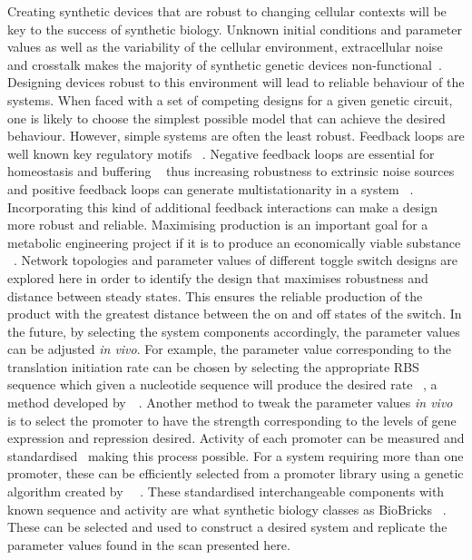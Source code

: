 Creating synthetic devices that are robust to changing cellular contexts will be key to the success of synthetic biology. Unknown initial conditions and parameter values as well as the variability of the cellular environment, extracellular noise and crosstalk makes the majority of synthetic genetic devices non-functional~\autocite{Chen:2009ea}. Designing devices robust to this environment will lead to reliable behaviour of the systems.
When faced with a set of competing designs for a given genetic circuit, one is likely to choose the simplest possible model that can achieve the desired behaviour. However, simple systems are often the least robust. Feedback loops are well known key regulatory motifs ~\autocite{Brandman:2005ci}. Negative feedback loops are essential for homeostasis and buffering ~\autocite{Thomas:1995id} thus increasing robustness to extrinsic noise sources and positive feedback loops can generate multistationarity in a system ~\autocite{Thomas:1995id}. Incorporating this kind of additional feedback interactions can make a design more robust and reliable. 
Maximising production is an important goal for a metabolic engineering project if it is to produce an economically viable substance ~\autocite{Holtz:2010bm}. Network topologies and parameter values of different toggle switch designs are explored here in order to identify the design that maximises robustness and distance between steady states. This ensures the reliable production of the product with the greatest distance between the on and off states of the switch. 
 In the future, by selecting the system components accordingly, the parameter values can be adjusted \textit{in vivo}. For example, the parameter value corresponding to the translation initiation rate can be chosen by selecting the appropriate RBS sequence which given a nucleotide sequence will produce the desired rate ~\autocite{Holtz:2010bm}, a method developed by~\textcite{Salis:2009gk}~\autocite{Salis:2009gk}. Another method to tweak the parameter values \textit{in vivo} is to select the promoter to have the strength corresponding to the levels of gene expression and repression desired. Activity of each promoter can be measured and standardised~\autocite{Kelly:2009bj} making this process possible. For a system requiring more than one promoter, these can be efficiently selected from a promoter library using a genetic algorithm created by~\textcite{Wu:2011bq} ~\autocite{Wu:2011bq}. These standardised interchangeable components with known sequence and activity are what synthetic biology classes as BioBricks ~\autocite{Kelly:2009bj,Canton:2008fv}. These can be selected and used to construct a desired system and replicate the parameter values found in the scan presented here.

